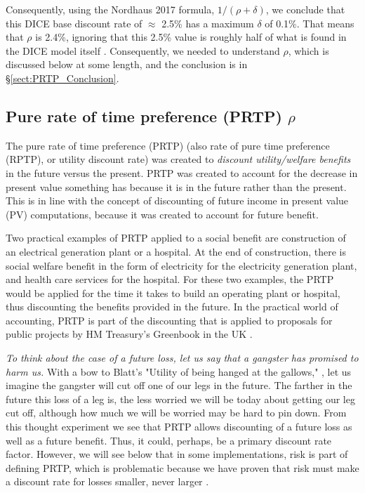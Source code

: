 \documentclass{article}
\begin{document}
Consequently, using the Nordhaus 2017 formula, $1/(\rho + \delta)$, we conclude that this DICE base discount rate of $\approx$ 2.5\% has a maximum $\delta$ of 0.1\%. That means that $\rho$ is 2.4\%, ignoring that this 2.5\% value is roughly half of what is found in the DICE model itself \cite{nordhaussztorc2016Rdice}. Consequently, we needed to understand $\rho$, which is discussed below at some length, and the conclusion is in \S\ref{sect:PRTP_Conclusion}.  

\subsection{Pure rate of time preference (PRTP) $\rho$}
\label{sect:PRTP}
The pure rate of time preference (PRTP) (also rate of pure time preference (RPTP), or utility discount rate) was created to \emph{discount utility/welfare benefits} in the future versus the present.  PRTP was created to account for the decrease in present value something has because it is in the future rather than the present. This is in line with the concept of discounting of future income in present value (PV) computations, because it was created to account for future benefit. 

Two practical examples of PRTP applied to a social benefit are construction of an electrical generation plant or a hospital. At the end of construction, there is social welfare benefit in the form of electricity for the electricity generation plant, and health care services for the hospital. For these two examples, the PRTP would be applied for the time it takes to build an operating plant or hospital, thus discounting the benefits provided in the future. In the practical world of accounting, PRTP is part of the discounting that is applied to proposals for public projects by HM Treasury's Greenbook in the UK \cite{HMTreasury2022GreenBook}. 

\emph{To think about the case of a future loss, let us say that a gangster has promised to harm us.} With a bow to Blatt's "Utility of being hanged at the gallows," \cite{Blatt1979UtilitiyOfHangedGallows}, let us imagine the gangster will cut off one of our legs in the future. The farther in the future this loss of a leg is, the less worried we will be today about getting our leg cut off, although how much we will be worried may be hard to pin down. From this thought experiment we see that PRTP allows discounting of a future loss as well as a future benefit. Thus, it could, perhaps, be a primary discount rate factor. However, we will see below that in some implementations, risk is part of defining PRTP, which is problematic because we have proven that risk must make a discount rate for losses smaller, never larger \cite{Hanley2022SignOfRiskForFutureLosses}.   
\end{document}

